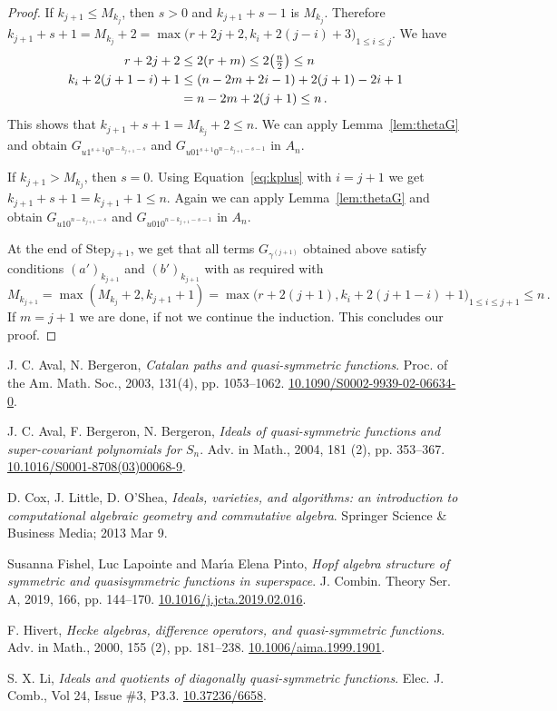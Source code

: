 \documentclass[11pt]{amsart}
\theoremstyle{definition}
\numberwithin{equation}{section}
\begin{document}
\begin{proof}
If $k_{j+1}\le M_{k_j}$, then $s>0$ and $k_{j+1}+s-1$ is $M_{k_j}$. Therefore $k_{j+1}+s+1=M_{k_j}+2=\max\big(r+2j+2,k_i+2(j-i)+3\big)_{1\le i\le j}$. We have
\begin{align}
 r+2j+2&\le  2(r+m)\le 2\big({\textstyle \frac{n}{2}}\big)\le n \label{eq:rplus}\\
 k_i+2(j+1-i)+1&\le (n-2m+2i-1)+2(j+1)-2i+1 \label{eq:kplus}\\
&=n-2m+2(j+1)\le n\,. \notag
 \end{align}
 This shows that $k_{j+1}+s+1=M_{k_j}+2\le n$.
We can apply Lemma~\ref{lem:thetaG} and obtain $G_{u1^{s+1}0^{n-k_{j+1}-s}}$ and $G_{u01^{s+1}0^{n-k_{j+1}-s-1}}$ in $A_n$.

If $k_{j+1}> M_{k_j}$, then $s=0$. Using Equation~\ref{eq:kplus} with $i=j+1$ we get $k_{j+1}+s+1=k_{j+1}+1\le n$.
Again we can apply Lemma~\ref{lem:thetaG} and obtain $G_{u10^{n-k_{j+1}-s}}$ and $G_{u010^{n-k_{j+1}-s-1}}$ in $A_n$.

At the end of Step$_{j+1}$, we get that all terms $G_{\gamma^{(j+1)}}$ obtained above satisfy conditions $(a')_{k_{j+1}}$ and $(b')_{k_{j+1}}$ with as required with
 $$M_{k_{j+1}}=\max(M_{k_j}+2,k_{j+1}+1) = \max\big(r+2(j+1),k_i+2(j+1-i)+1\big)_{1\le i\le j+1}\le n\,.$$
If $m=j+1$ we are done, if not we continue the induction.
This concludes our proof.
\end{proof}

\vskip 1in

\begin{thebibliography}{999}

 J. C. Aval, N. Bergeron,
\textit{Catalan paths and quasi-symmetric functions}.
Proc. of the Am. Math. Soc., 2003, 131(4), pp. 1053--1062.
\href{https://doi.org/10.1090/S0002-9939-02-06634-0}{10.1090/S0002-9939-02-06634-0}.

 J. C. Aval, F. Bergeron, N. Bergeron,
\textit{Ideals of quasi-symmetric functions and super-covariant polynomials for $S_n$}.
Adv. in Math., 2004, 181 (2), pp. 353--367.
\href{https://doi.org/10.1016/S0001-8708(03)00068-9}{10.1016/S0001-8708(03)00068-9}.

 D. Cox, J. Little, D. O'Shea,
\textit{Ideals, varieties, and algorithms: an introduction to computational
algebraic geometry and commutative algebra}.
Springer Science \& Business Media; 2013 Mar 9.

Susanna Fishel, Luc Lapointe and Mar\'{\i}a Elena Pinto,
\textit{Hopf algebra structure of symmetric and quasisymmetric
              functions in superspace}.
 {J. Combin. Theory Ser. A}, 2019, 166, pp.  {144--170}.
\href{https://doi-org/10.1016/j.jcta.2019.02.016}{10.1016/j.jcta.2019.02.016}.

 F. Hivert, 
\textit{Hecke algebras, difference operators, and quasi-symmetric
              functions}.
Adv. in Math., 2000, 155 (2), pp. 181--238.
\href{https://doi-org/10.1006/aima.1999.1901}{10.1006/aima.1999.1901}.

 S. X. Li,
\textit{Ideals and quotients of diagonally quasi-symmetric functions}.
Elec. J. Comb., Vol 24, Issue \#3, P3.3.
\href{https://doi.org/10.37236/6658}{10.37236/6658}.
\end{thebibliography}
\end{document}
